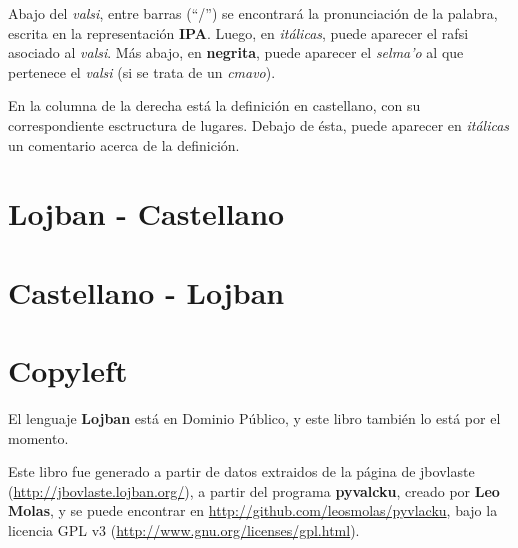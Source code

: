 \documentclass[ipa,twoside]{report}
\begin{document}
Abajo del \textsl{valsi}, entre barras (``/'') se encontrará la pronunciación de la palabra, escrita en la representación \textbf{IPA}. Luego, en \textit{itálicas}, puede aparecer el rafsi asociado al \textsl{valsi}. Más abajo, en \textbf{negrita}, puede aparecer el \textsl{selma'o} al que pertenece el \textsl{valsi} (si se trata de un \textsl{cmavo}).

En la columna de la derecha está la definición en castellano, con su correspondiente esctructura de lugares. Debajo de ésta, puede aparecer en \textit{itálicas} un comentario acerca de la definición.

\newpage

\setlength{\headheight}{25pt}
\fancyhead{}				          %
\fancyfoot{}        				  %
\fancyhead[LE,LO]{\rightmark} %
\fancyhead[RE,RO]{\leftmark}  %
\fancyfoot[LE,RO]{\thepage}   %
\setlength{\columnseprule}{0.3pt}
\pagestyle{fancy}
\thispagestyle{plain}

\chapter*{Lojban - Castellano}

\label{cha:lojcas}
\begin{multicols}{2}


  
\end{multicols}

\newpage 
\setlength{\leftfield}{0.25\textwidth}
\setlength{\rightfield}{0.25\textwidth}

\thispagestyle{plain}
\chapter*{Castellano - Lojban}

\label{cha:casloj}
\begin{multicols}{2}



\end{multicols}


\chapter*{Copyleft}
El lenguaje \textbf{Lojban} está en Dominio Público, y este libro también lo está por el momento.

Este libro fue generado a partir de datos extraidos de la página de jbovlaste (\url{http://jbovlaste.lojban.org/}), a partir del programa \textbf{\ttfamily pyvalcku}, creado por \textbf{Leo Molas}, y se puede encontrar en \url{http://github.com/leosmolas/pyvlacku}, bajo la licencia GPL v3 (\url{http://www.gnu.org/licenses/gpl.html}).
\end{document}
